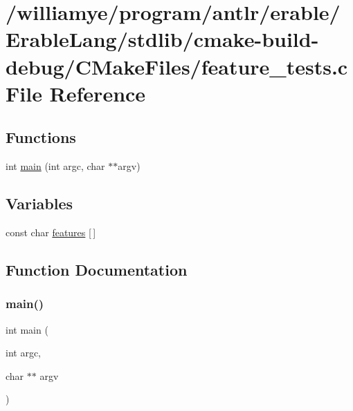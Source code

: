 \hypertarget{stdlib_2cmake-build-debug_2_c_make_files_2feature__tests_8c}{}\section{/williamye/program/antlr/erable/\+Erable\+Lang/stdlib/cmake-\/build-\/debug/\+C\+Make\+Files/feature\+\_\+tests.c File Reference}
\label{stdlib_2cmake-build-debug_2_c_make_files_2feature__tests_8c}
\subsection*{Functions}
\begin{DoxyCompactItemize}
\item 
int \mbox{\hyperlink{stdlib_2cmake-build-debug_2_c_make_files_2feature__tests_8c_a3c04138a5bfe5d72780bb7e82a18e627}{main}} (int argc, char $\ast$$\ast$argv)
\end{DoxyCompactItemize}
\subsection*{Variables}
\begin{DoxyCompactItemize}
\item 
const char \mbox{\hyperlink{stdlib_2cmake-build-debug_2_c_make_files_2feature__tests_8c_a1582568e32f689337602a16bf8a5bff0}{features}} \mbox{[}$\,$\mbox{]}
\end{DoxyCompactItemize}


\subsection{Function Documentation}
\mbox{\label{stdlib_2cmake-build-debug_2_c_make_files_2feature__tests_8c_a3c04138a5bfe5d72780bb7e82a18e627}} 
\subsubsection{\texorpdfstring{main()}{main()}}
{\footnotesize\ttfamily int main (\begin{DoxyParamCaption}\item[{int}]{argc,  }\item[{char $\ast$$\ast$}]{argv }\end{DoxyParamCaption})}



